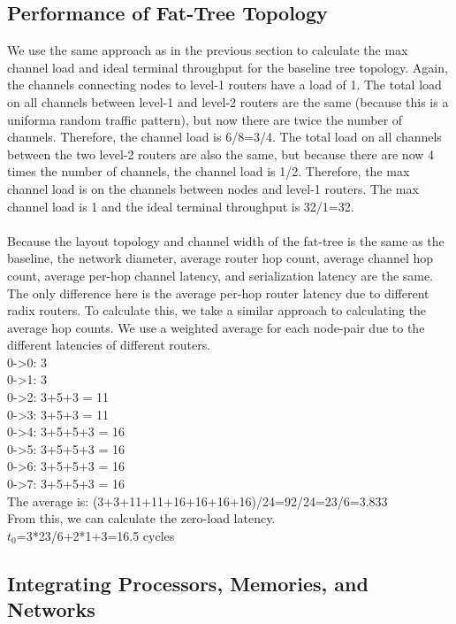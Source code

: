 \documentclass[10pt]{article}
\begin{document}
\subsection{Performance of Fat-Tree Topology}
We use the same approach as in the previous section to calculate the max channel load and ideal terminal throughput for the baseline tree topology. Again, the channels connecting nodes to level-1 routers have a load of 1. The total load on all channels between level-1 and level-2 routers are the same (because this is a uniforma random traffic pattern), but now there are twice the number of channels. Therefore, the channel load is 6/8=3/4. The total load on all channels between the two level-2 routers are also the same, but because there are now 4 times the number of channels, the channel load is 1/2. Therefore, the max channel load is on the channels between nodes and level-1 routers. The max channel load is 1 and the ideal terminal throughput is 32/1=32.\\
\\
Because the layout topology and channel width of the fat-tree is the same as the baseline, the network diameter, average router hop count, average channel hop count, average per-hop channel latency, and serialization latency are the same.\\
The only difference here is the average per-hop router latency due to different radix routers. To calculate this, we take a similar approach to calculating the average hop counts. We use a weighted average for each node-pair due to the different latencies of different routers.\\
0->0: 3\\
0->1: 3\\
0->2: 3+5+3 = 11\\
0->3: 3+5+3 = 11\\
0->4: 3+5+5+3 = 16\\
0->5: 3+5+5+3 = 16\\ 
0->6: 3+5+5+3 = 16\\ 
0->7: 3+5+5+3 = 16\\
The average is: (3+3+11+11+16+16+16+16)/24=92/24=23/6=3.833\\
From this, we can calculate the zero-load latency.\\
$t_0$=3*23/6+2*1+3=16.5 cycles
\subsection{Integrating Processors, Memories, and Networks}
\end{document}
